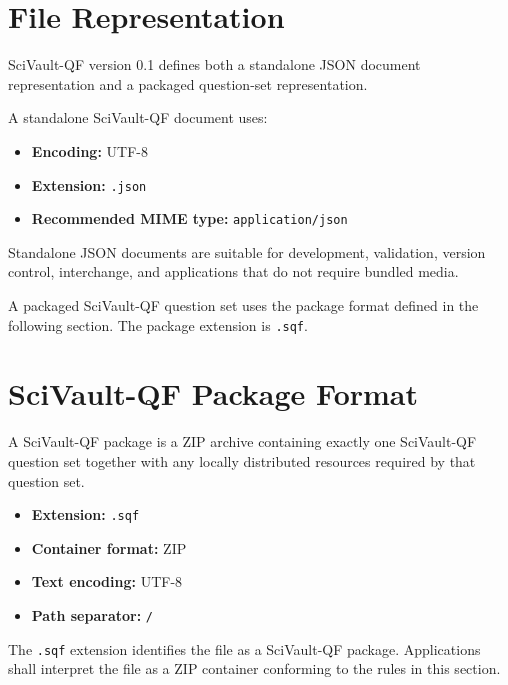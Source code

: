 \documentclass[11pt]{article}
\begin{document}
	\section{File Representation}
	
	SciVault-QF version 0.1 defines both a standalone JSON document
	representation and a packaged question-set representation.
	
	A standalone SciVault-QF document uses:
	
	\begin{itemize}
		\item \textbf{Encoding:} UTF-8
		\item \textbf{Extension:} \texttt{.json}
		\item \textbf{Recommended MIME type:} \texttt{application/json}
	\end{itemize}
	
	Standalone JSON documents are suitable for development, validation, version
	control, interchange, and applications that do not require bundled media.
	
	A packaged SciVault-QF question set uses the package format defined in the
	following section. The package extension is \texttt{.sqf}.
	
	\section{SciVault-QF Package Format}
	
	A SciVault-QF package is a ZIP archive containing exactly one SciVault-QF
	question set together with any locally distributed resources required by
	that question set.
	
	\begin{itemize}
		\item \textbf{Extension:} \texttt{.sqf}
		\item \textbf{Container format:} ZIP
		\item \textbf{Text encoding:} UTF-8
		\item \textbf{Path separator:} \texttt{/}
	\end{itemize}
	
	The \texttt{.sqf} extension identifies the file as a SciVault-QF package.
	Applications shall interpret the file as a ZIP container conforming to the
	rules in this section.
	
\end{document}
